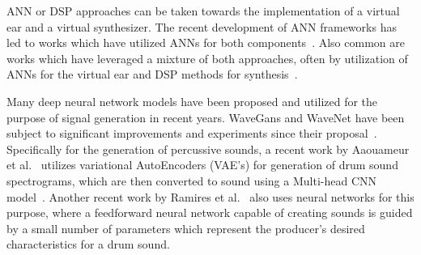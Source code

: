 \documentclass[\main/thesis.tex]{subfiles}
\begin{document}
ANN or DSP approaches can be taken towards the implementation of a virtual ear and a virtual synthesizer. The recent development of ANN frameworks has led to works which have utilized ANNs for both components~\cite{oord2016wavenet,yamamoto2020parallel,ramires2020neural}. Also common are works which have leveraged a mixture of both approaches, often by utilization of ANNs for the virtual ear and DSP methods for synthesis~\cite{aouameur2019neural,yee2018automatic}.

Many deep neural network models have been proposed and utilized for the purpose of signal generation in recent years. WaveGans and WaveNet have been subject to significant improvements and experiments since their proposal~\cite{nsynth2017,yamamoto2020parallel,oord2017parallel}. Specifically for the generation of percussive sounds, a recent work by Aaouameur et al.~\cite{aouameur2019neural} utilizes variational AutoEncoders (VAE's) for generation of drum sound spectrograms, which are then converted to sound using a Multi-head CNN model~\cite{aouameur2019neural}. Another recent work by Ramires et al.~\cite{ramires2020neural} also uses neural networks for this purpose, where a feedforward neural network capable of creating sounds is guided by a small number of parameters which represent the producer's desired characteristics for a drum sound. 
\end{document}
